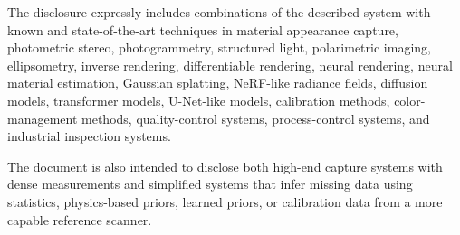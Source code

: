 \documentclass[11pt, twoside, listof=totocnumbered, bibliography=totocnumbered]{scrartcl}
\begin{document}
	The disclosure expressly includes combinations of the described system with known and state-of-the-art techniques in material appearance capture, photometric stereo, photogrammetry, structured light, polarimetric imaging, ellipsometry, inverse rendering, differentiable rendering, neural rendering, neural material estimation, Gaussian splatting, NeRF-like radiance fields, diffusion models, transformer models, U-Net-like models, calibration methods, color-management methods, quality-control systems, process-control systems, and industrial inspection systems. \cite{WEYRICH2009,GUARNERA2016,AITTALA2015,DESCHAINTRE2018,GAO2019,HWANG2022,KERBL2023}
	
	The document is also intended to disclose both high-end capture systems with dense measurements and simplified systems that infer missing data using statistics, physics-based priors, learned priors, or calibration data from a more capable reference scanner.
	
\end{document}
